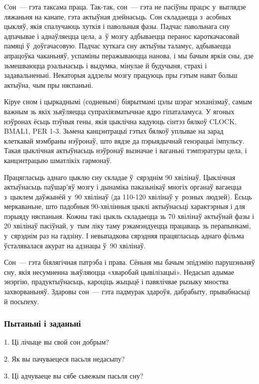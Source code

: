 Cон~--- гэта таксама праца. Так-так, сон~--- гэта не пасіўны працэс у~выглядзе ляжаньня на канапе, гэта актыўная дзейнасьць. Сон складаецца з~асобных цыкляў, якія спалучаюць хуткія і павольныя фазы. Падчас павольнага сну адпачывае і аднаўляецца цела, а~ў мозгу адбываецца перанос кароткачасовай памяці ў~доўгачасовую. Падчас хуткага сну актыўны таламус, адбываецца апрацоўка чаканьняў, успаміны перажываюцца нанова, і мы бачым яркія сны, дзе зьмешваюцца рэальнасьць і выдумка, мінулае й будучыня, страхі і задавальненьні. Некаторыя аддзелы мозгу працуюць пры гэтым нават больш актыўна, чым пры няспаньні.

Кіруе сном і цыркаднымі (содневымі) біярытмамі цэлы шэраг мэханізмаў, самым важным зь якіх зьяўляецца супрахіязматычнае ядро гіпаталамуса. У ягоных нэўронах ёсьць пэўныя гены, якія цыклічна кадуюць сінтэз бялкоў CLOCK, BMAL1, PER 1-3. Зьмена канцэнтрацыі гэтых бялкоў уплывае на зарад клеткавай мэмбраны нэўронаў, што вядзе да пэрыядычнай генэрацыі імпульсу. Такая цыклічная актыўнасьць нэўронаў вызначае і ваганьні тэмпэратуры цела, і канцэнтрацыю шматлікіх гармонаў.

Працягласьць аднаго цыклю сну складае ў~сярэднім 90 хвілінаў. Цыклічная актыўнасьць паўшар'яў мозгу і дынаміка паказьнікаў многіх органаў вагаецца з~цыклем даўжынёй у~90 хвілінаў (да 110-120 хвілінаў у~розных людзей). Ёсьць меркаваньне, што падобныя 90-хвілінныя цыклі актыўнасьці характэрныя і для пэрыяду няспаньня. Кожны такі цыкль складаецца зь 70 хвілінаў актыўнай фазы і 20 хвілінаў пасіўнай, у~тым ліку таму рэкамэндуецца працаваць зь перапынкамі, у~сярэднім раз на гадзіну. І невыпадкова сярэдняя працягласьць аднаго фільма ўсталявалася акурат на адзнацы ў~90 хвілінаў.

Сон~--- гэта біялягічная патрэба і права. Сёньня мы бачым эпідэмію парушэньняў сну, якія несумненна зьяўляюцца «хваробай цывілізацыі». Недасып адымае энэргію, прадуктыўнасьць, кароціць жыцьцё і павялічвае рызыку мноства захворваньняў. Здаровы сон~--- гэта падмурак здароўя, дабрабыту, прывабнасьці й посьпеху.

\subsubsection{Пытаньні і заданьні}

1. Ці лічыце вы свой сон добрым?

2. Як вы пачуваецеся пасьля недасыпу?

3. Ці адчуваеце вы сябе сьвежым пасьля сну?


